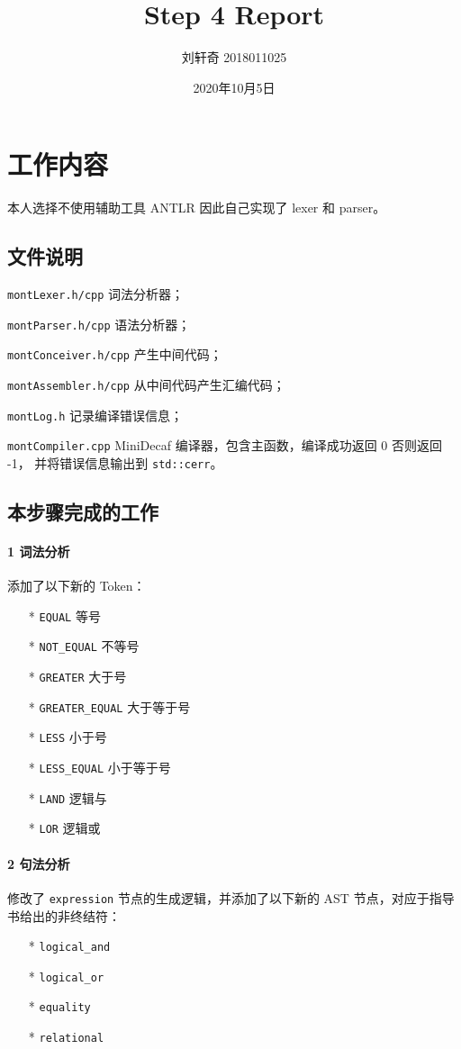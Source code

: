 \documentclass[UTF8]{ctexart}
\title{Step 4 Report}
\author{刘轩奇 2018011025}
\date{2020年10月5日}
\newcommand{\T}[1]{\texttt{{#1}}}
\begin{document}
    \maketitle
    \section{工作内容}
        本人选择不使用辅助工具 ANTLR 因此自己实现了 lexer 和 parser。
        \subsection{文件说明} 
            \T{montLexer.h/cpp} 词法分析器；

            \T{montParser.h/cpp} 语法分析器；

            \T{montConceiver.h/cpp} 产生中间代码；

            \T{montAssembler.h/cpp} 从中间代码产生汇编代码；
            
            \T{montLog.h} 记录编译错误信息；

            \T{montCompiler.cpp} MiniDecaf 编译器，包含主函数，编译成功返回 0 否则返回 -1，
            并将错误信息输出到 \T{std::cerr}。
        
        \subsection{本步骤完成的工作}

            \paragraph{1 词法分析} 添加了以下新的 Token：
            \begin{itemize}
                \item[*] \T{EQUAL} 等号
                \item[*] \T{NOT\_EQUAL} 不等号
                \item[*] \T{GREATER} 大于号
                \item[*] \T{GREATER\_EQUAL} 大于等于号
                \item[*] \T{LESS} 小于号
                \item[*] \T{LESS\_EQUAL} 小于等于号
                \item[*] \T{LAND} 逻辑与
                \item[*] \T{LOR} 逻辑或
            \end{itemize}

            \paragraph{2 句法分析} 修改了 \T{expression} 节点的生成逻辑，并添加了以下新的 AST 节点，对应于指导书给出的非终结符：
            \begin{itemize}
                \item[*] \T{logical\_and}
                \item[*] \T{logical\_or}
                \item[*] \T{equality}
                \item[*] \T{relational}    
            \end{itemize}
\end{document}
